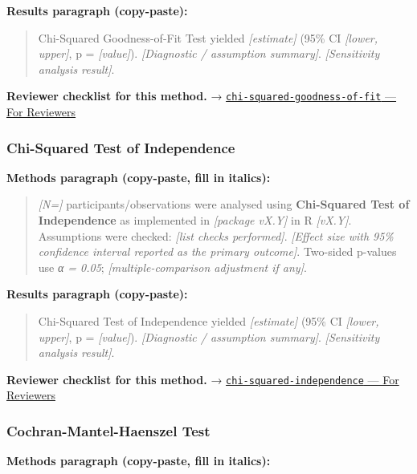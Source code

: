 \documentclass[
]{article}
\begin{document}
\textbf{Results paragraph (copy-paste):}

\begin{quote}
Chi-Squared Goodness-of-Fit Test yielded \emph{{[}estimate{]}} (95\% CI
\emph{{[}lower, upper{]}}, p = \emph{{[}value{]}}). \emph{{[}Diagnostic
/ assumption summary{]}}. \emph{{[}Sensitivity analysis result{]}}.
\end{quote}

\textbf{Reviewer checklist for this method.} →
\href{../chapters/04-inferential/chi-squared-goodness-of-fit.Rmd\#for-reviewers}{\texttt{chi-squared-goodness-of-fit}
--- For Reviewers}

\subsubsection{Chi-Squared Test of
Independence}\label{chi-squared-test-of-independence}

\textbf{Methods paragraph (copy-paste, fill in italics):}

\begin{quote}
\emph{{[}N={]}} participants/observations were analysed using
\textbf{Chi-Squared Test of Independence} as implemented in
\emph{{[}package vX.Y{]}} in R \emph{{[}vX.Y{]}}. Assumptions were
checked: \emph{{[}list checks performed{]}}. \emph{{[}Effect size with
95\% confidence interval reported as the primary outcome{]}}. Two-sided
p-values use \emph{α = 0.05}; \emph{{[}multiple-comparison adjustment if
any{]}}.
\end{quote}

\textbf{Results paragraph (copy-paste):}

\begin{quote}
Chi-Squared Test of Independence yielded \emph{{[}estimate{]}} (95\% CI
\emph{{[}lower, upper{]}}, p = \emph{{[}value{]}}). \emph{{[}Diagnostic
/ assumption summary{]}}. \emph{{[}Sensitivity analysis result{]}}.
\end{quote}

\textbf{Reviewer checklist for this method.} →
\href{../chapters/04-inferential/chi-squared-independence.Rmd\#for-reviewers}{\texttt{chi-squared-independence}
--- For Reviewers}

\subsubsection{Cochran-Mantel-Haenszel
Test}\label{cochran-mantel-haenszel-test}

\textbf{Methods paragraph (copy-paste, fill in italics):}
\end{document}
